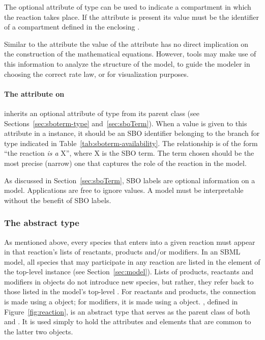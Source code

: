 The optional attribute  of type  
can be used to indicate a compartment in which the reaction takes place. 
If the attribute is present its value must be the identifier of a 
compartment defined in the enclosing \Model. 

Similar to the  attribute the value of the  
attribute has no direct implication on the construction of the
mathematical equations. However, tools may make use of this information 
to analyze the structure of the model, to guide the modeler in choosing 
the correct rate law, or for visualization purposes.  

\paragraph{The  attribute on }
\label{sec:reaction-sboterm}

\Reaction inherits an optional 
attribute of type  from its parent
class \SBase (see Sections~\ref{sec:sboterm-type}
and~\ref{sec:sboTerm}).  When a value is given to this
attribute in a  \Reaction instance, it should be an
SBO identifier belonging to the branch for type  \Reaction  
indicated in Table~\ref{tab:sboterm-availability}.  The relationship is
of the form ``the reaction \emph{is a} X'', where X is
the SBO term.  The term chosen should be the most precise (narrow)
one that captures the role of the reaction in the model.

As discussed in Section~\ref{sec:sboTerm}, SBO labels are optional
information on a model.  Applications are free to ignore
 values.  A model must be interpretable without the
benefit of SBO labels.

\subsubsection{The  abstract type}
\label{subsec:simplespeciesreference}

As mentioned above, every species that enters into a given
reaction must appear in that reaction's lists of reactants,
products and/or modifiers.  In an SBML model, all species that may
participate in any reaction are listed in the
 element of the top-level \Model instance
(see Section~\ref{sec:model}).  Lists of products, reactants and
modifiers in \Reaction objects do not introduce new species,
but rather, they refer back to those listed in the model's
top-level .  For reactants and products, the
connection is made using a \SpeciesReference object; for
modifiers, it is made using a \ModifierSpeciesReference 
object.  \SimpleSpeciesReference, defined in
Figure~\vref{fig:reaction}, is an abstract type that serves as the
parent class of both \SpeciesReference and
\ModifierSpeciesReference.  It is used simply to hold the attributes
and elements that are common to the latter two objects.


